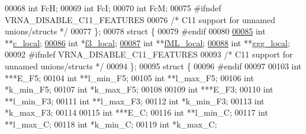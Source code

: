 \begin{DoxyCode}
00068       \textcolor{keywordtype}{int}     FcH;
00069       \textcolor{keywordtype}{int}     FcI;
00070       \textcolor{keywordtype}{int}     FcM;
00075 \textcolor{preprocessor}{#ifndef VRNA\_DISABLE\_C11\_FEATURES}
00076     \textcolor{comment}{/* C11 support for unnamed unions/structs */}
00077     \};
00078     \textcolor{keyword}{struct }\{
00079 \textcolor{preprocessor}{#endif}
00080 
\hypertarget{dp__matrices_8h_source.tex_l00085}{}\hyperlink{group__dp__matrices_a116c677ece0832e6ab9cc2fd1ebfe452}{00085}       \textcolor{keywordtype}{int}     **\hyperlink{group__dp__matrices_a116c677ece0832e6ab9cc2fd1ebfe452}{c\_local};    
\hypertarget{dp__matrices_8h_source.tex_l00086}{}\hyperlink{group__dp__matrices_a6eae0a2b696b0c63bbaa78a70b950600}{00086}       \textcolor{keywordtype}{int}     *\hyperlink{group__dp__matrices_a6eae0a2b696b0c63bbaa78a70b950600}{f3\_local};    
\hypertarget{dp__matrices_8h_source.tex_l00087}{}\hyperlink{group__dp__matrices_ad37d705240a8e6b1e9a4e4ea19e74003}{00087}       \textcolor{keywordtype}{int}     **\hyperlink{group__dp__matrices_ad37d705240a8e6b1e9a4e4ea19e74003}{fML\_local};  
\hypertarget{dp__matrices_8h_source.tex_l00088}{}\hyperlink{group__dp__matrices_afd3ea65bc8f06559f7f1ea79072fa385}{00088}       \textcolor{keywordtype}{int}     **\hyperlink{group__dp__matrices_afd3ea65bc8f06559f7f1ea79072fa385}{ggg\_local};  
00092 \textcolor{preprocessor}{#ifndef VRNA\_DISABLE\_C11\_FEATURES}
00093     \textcolor{comment}{/* C11 support for unnamed unions/structs */}
00094     \};
00095     \textcolor{keyword}{struct }\{
00096 \textcolor{preprocessor}{#endif}
00097 
00103       \textcolor{keywordtype}{int}             ***E\_F5;
00104       \textcolor{keywordtype}{int}             **l\_min\_F5;
00105       \textcolor{keywordtype}{int}             **l\_max\_F5;
00106       \textcolor{keywordtype}{int}             *k\_min\_F5;
00107       \textcolor{keywordtype}{int}             *k\_max\_F5;
00108 
00109       \textcolor{keywordtype}{int}             ***E\_F3;
00110       \textcolor{keywordtype}{int}             **l\_min\_F3;
00111       \textcolor{keywordtype}{int}             **l\_max\_F3;
00112       \textcolor{keywordtype}{int}             *k\_min\_F3;
00113       \textcolor{keywordtype}{int}             *k\_max\_F3;
00114 
00115       \textcolor{keywordtype}{int}             ***E\_C;
00116       \textcolor{keywordtype}{int}             **l\_min\_C;
00117       \textcolor{keywordtype}{int}             **l\_max\_C;
00118       \textcolor{keywordtype}{int}             *k\_min\_C;
00119       \textcolor{keywordtype}{int}             *k\_max\_C;

\end{DoxyCode}
